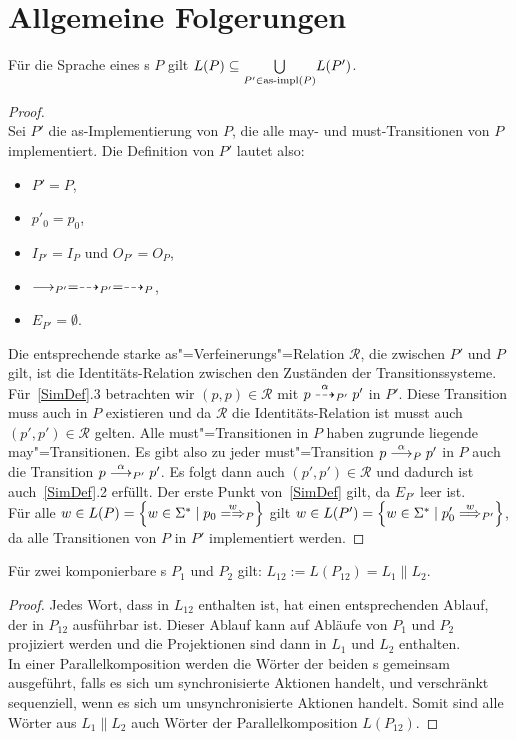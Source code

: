 \section{Allgemeine Folgerungen}
\label{saetzeKapitel}

\begin{Prop}
  \label{LImpProp}
  Für die Sprache eines \MEIO{}s $P$ gilt $L(P) \subseteq \underset{P'\in\mathrm{as}\text{-}\mathrm{impl}
  (P)}{\bigcup} L(P')$.
\end{Prop}
\begin{proof}\mbox{}\\
  Sei $P'$ die as-Implementierung von $P$, die alle may- und must-Transitionen
  von $P$ implementiert. Die Definition von $P'$ lautet also:
  \begin{itemize}
    \item $P'=P$,
    \item $p'_0=p_0$,
    \item $I_{P'}=I_P$ und $O_{P'}=O_P$,
    \item $\must _{P'} =\may _{P'} = \may _P$,
    \item $E_{P'}=\emptyset$.
  \end{itemize}
  Die entsprechende starke as"=Verfeinerungs"=Relation $\mathcal{R}$, die
  zwischen $P'$ und $P$ gilt, ist die Identitäts-Relation zwischen den
  Zuständen der Transitionssysteme. Für~\ref{SimDef}.3 betrachten wir $(p,p)
  \in\mathcal{R}$ mit $p\may[\alpha]_{P'} p'$ in $P'$. Diese Transition muss
  auch in $P$ existieren und da $\mathcal{R}$ die Identitäts-Relation ist musst
  auch $(p',p')\in\mathcal{R}$ gelten. Alle must"=Transitionen in $P$ haben
  zugrunde liegende may"=Transitionen. Es gibt also zu jeder must"=Transition
  $p \must[\alpha]_P p'$ in $P$ auch die Transition $p\must[\alpha]_{P'} p'$.
  Es folgt dann auch $(p',p') \in \mathcal{R}$ und dadurch ist
  auch~\ref{SimDef}.2 erfüllt. Der erste Punkt von~\ref{SimDef} gilt, da
  $E_{P'}$ leer ist.\\
  Für alle $w\in L(P) = \left\{w\in \Sigma ^* \mid p_0\weakmay[w]_P\right\}$
  gilt $w\in L(P') = \left\{w\in \Sigma ^* \mid p'_0 \weakmust[w]_{P'}
  \right\}$, da alle Transitionen von $P$ in $P'$ implementiert werden.
\end{proof}

\begin{Prop}
  \label{LParallelProp}
  Für zwei komponierbare \MEIO{}s $P_1$ und $P_2$ gilt: $L_{12} := L(P_{12}) =
  L_1\|L_2$.
\end{Prop}
\begin{proof}
  Jedes Wort, dass in $L_{12}$ enthalten ist, hat einen entsprechenden Ablauf,
  der in $P_{12}$ ausführbar ist. Dieser Ablauf kann auf Abläufe von $P_1$ und
  $P_2$ projiziert werden und die Projektionen sind dann in $L_1$ und $L_2$
  enthalten.\\
  In einer Parallelkomposition werden die Wörter der beiden \MEIO{}s gemeinsam
  ausgeführt, falls es sich um synchronisierte Aktionen handelt, und
  verschränkt sequenziell, wenn es sich um unsynchronisierte Aktionen handelt.
  Somit sind alle Wörter aus $L_1\|L_2$ auch Wörter der Parallelkomposition
  $L(P_{12})$.
\end{proof}

